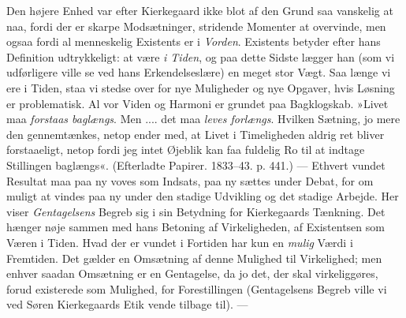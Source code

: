 \documentclass[12pt,a4paper,openany]{book}
\newcommand{\opage}[1]{\marginnote{\footnotesize\textit{[#1]}}}
\begin{document}
Den højere Enhed var efter Kierkegaard ikke blot
af den Grund saa vanskelig at naa, fordi der er skarpe
Modsætninger, stridende Momenter at overvinde, men
ogsaa fordi al menneskelig Existents er i \textit{Vorden}. Existents
betyder efter hans Definition udtrykkeligt: at være \textit{i
Tiden}, og paa dette Sidste lægger han (som vi udførligere
ville se ved hans Erkendelseslære) en meget stor Vægt.
Saa længe vi ere i Tiden, staa vi stedse over for nye
Muligheder og nye Opgaver, hvis Løsning er problematisk.
Al vor Viden og Harmoni er grundet paa Bagklogskab.
»Livet maa \textit{forstaas baglængs}. Men .... det maa \textit{leves
forlængs}. Hvilken Sætning, jo mere den gennemtænkes,
netop ender med, at Livet i Timeligheden aldrig ret
bliver forstaaeligt, netop fordi jeg intet Øjeblik kan faa
fuldelig Ro til at indtage Stillingen baglængs«. (Efterladte
Papirer. 1833--43. p. 441.) --- Ethvert vundet
Resultat maa paa ny voves som Indsats, paa ny sættes
under Debat, for om muligt at vindes paa ny under den
stadige Udvikling og det stadige Arbejde. Her viser
\textit{Gentagelsens} Begreb sig i sin Betydning for Kierkegaards
Tænkning. Det hænger nøje sammen med hans Betoning
af Virkeligheden, af Existentsen som Væren i Tiden.
Hvad der er vundet i Fortiden har kun en \textit{mulig} Værdi
i Fremtiden. Det gælder en Omsætning af denne Mulighed
til Virkelighed; men enhver saadan Omsætning er
en Gentagelse, da jo det, der skal virkeliggøres, forud
existerede som Mulighed, for Forestillingen (Gentagelsens
\opage{49}Begreb ville vi ved Søren Kierkegaards Etik vende tilbage
til). ---
\end{document}
